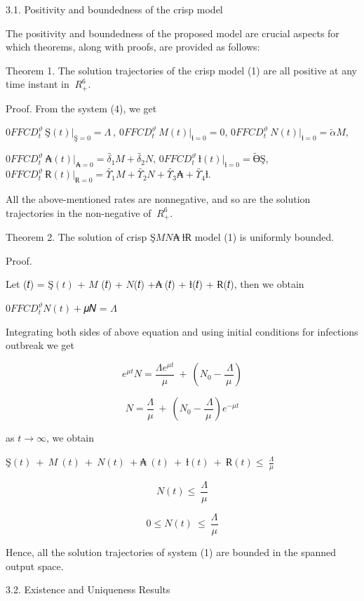 \documentclass[
]{article}
\begin{document}
3.1. Positivity and boundedness of the crisp model

The positivity and boundedness of the proposed model are crucial aspects for which theorems, along with proofs, are provided as follows:

Theorem 1. The solution trajectories of the crisp model (1) are all positive at any time instant in \({\ R}_{+}^{6}\).

Proof. From the system (4), we get

\({0FFCD_{t}^{\vartheta}\ Ş(t)|}_{Ş = 0} = \Lambda\ \), \({0FFCD_{t}^{\vartheta}\ M(t)|}_{ƚ = 0} = 0\), \({0FFCD_{t}^{\vartheta}\ N(t)|}_{ƚ = 0} = \widetilde{\alpha}M,\ \)

\({0FFCD_{t}^{\vartheta}\ ₳(t)|}_{₳ = 0} = \widetilde{\delta_{1}}M + \widetilde{\delta_{2}}N\), \({0FFCD_{t}^{\vartheta}\ ƚ(t)|}_{ƚ = 0} = \widetilde{Ө}Ş\), \({0FFCD_{t}^{\vartheta}\ Ɍ(t)|}_{Ɍ = 0} = \widetilde{\Upsilon_{1}}M + \widetilde{\Upsilon_{2}}N + \widetilde{\Upsilon_{3}}₳ + \widetilde{\Upsilon_{4}}ƚ\).

All the above-mentioned rates are nonnegative, and so are the solution trajectories in the non-negative of \({\ R}_{+}^{6}\).

Theorem 2. The solution of crisp \(ŞMN₳\ ƚɌ\) model (1) is uniformly bounded.

Proof.

Let (𝑡) = \(Ş(t)\) + \(M\) (𝑡) + \(N\)(𝑡) +\(₳\ \)(𝑡) + \(ƚ\)(𝑡) + \(Ɍ\)(𝑡), then we obtain

\(0FFCD_{t}^{\vartheta}N(t) +\)𝜇𝑁 = \(\Lambda\)

Integrating both sides of above equation and using initial conditions for infections outbreak we get

\[e^{\mu t}N = \frac{\Lambda e^{\mu t}}{\mu}\  + \ \left( N_{0} - \frac{\ \Lambda}{\mu} \right)\]

\[N = \frac{\Lambda}{\mu}\  + \ \left( N_{0} - \frac{\ \Lambda}{\mu} \right)e^{- \mu t}\]

as \(t \rightarrow \infty\), we obtain

\(Ş(t)\  + \ M\ (t)\  + \ N(t)\  + ₳\ (t)\  + \ ƚ(t)\  + \ Ɍ(t) \leq \ \frac{\Lambda}{\mu}\)

\[N(t) \leq \ \frac{\Lambda}{\mu}\]

\[0 \leq N(t)\  \leq \ \frac{\Lambda}{\mu}\]

Hence, all the solution trajectories of system (1) are bounded in the spanned output space.

3.2. Existence and Uniqueness Results
\end{document}
